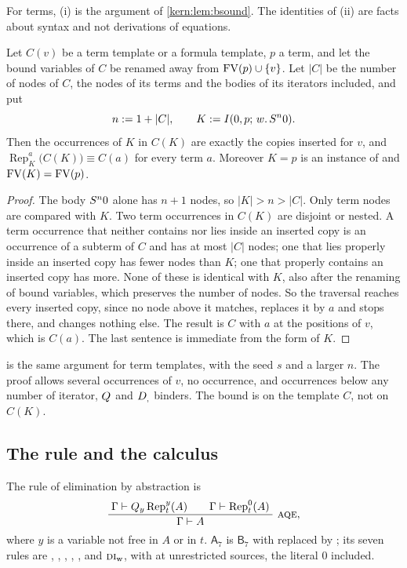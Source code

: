 For terms, (i) is the argument of \cref{kern:lem:bsound}.  The identities of
(ii) are facts about syntax and not derivations of equations.

\begin{lemma}
\label{kern:lem:fmarker}
Let $C(v)$ be a term template or a formula template, $p$ a term, and let
the bound variables of $C$ be renamed away from $\operatorname{FV}(p)\cup\{v\}$.  Let $|C|$
be the number of nodes of $C$, the nodes of its terms and the bodies of its
iterators included, and put
\[
 n\mathrel{:=} 1+|C|,\qquad K\mathrel{:=}I(0,p;\,w.\,S^{n}0).
\]
Then the occurrences of $K$ in $C(K)$ are exactly the copies inserted for
$v$, and $\operatorname{Rep}_{K}^{a}\bigl(C(K)\bigr)\equiv C(a)$ for every
term $a$.  Moreover $K=p$ is an instance of  and
$\operatorname{FV}(K)=\operatorname{FV}(p)$.
\end{lemma}

\begin{proof}
The body $S^{n}0$ alone has $n+1$ nodes, so $|K|>n>|C|$.  Only term
nodes are compared with $K$.  Two term
occurrences in $C(K)$ are disjoint or nested.  A term occurrence that neither
contains nor lies inside an inserted copy is an occurrence of a subterm of
$C$ and has at most $|C|$ nodes; one that lies properly inside an inserted
copy has fewer nodes than $K$; one that properly contains an inserted copy
has more.  None of these is identical with $K$, also after the renaming of
bound variables, which preserves the number of nodes.  So the traversal
reaches every inserted copy, since no node above it matches, replaces it by
$a$ and stops there, and changes nothing else.  The result is $C$ with $a$ at
the positions of $v$, which is $C(a)$.  The last sentence is immediate from
the form of $K$.
\end{proof}

 is the same argument for term templates, with the
seed $s$ and a larger $n$.  The proof allows several occurrences of $v$, no
occurrence, and occurrences below any number of iterator, $Q_{}$ and $D_{,}$
binders.  The bound is on the template $C$, not on $C(K)$.

\subsection{The rule and the calculus}
\label{kern:sec:aqerule}

\begin{definition}
\label{kern:def:A7}
The rule of elimination by abstraction is
\[
 \infrule{\Gamma\proves\Q{y}\operatorname{Rep}_{t}^{y}(A)\qquad
          \Gamma\proves\operatorname{Rep}_{t}^{0}(A)}
         {\Gamma\proves A}\ \rulename{AQE},
\]
where $y$ is a variable not free in $A$ or in $t$.
$\mathsf{A}_7$ is $\mathsf{B}_7$ with  replaced by
; its seven rules are , ,
, , ,  and
$\rulename{DI}_{\mathrm{w}}$, with  at unrestricted sources,
the literal $0$ included.
\end{definition}

